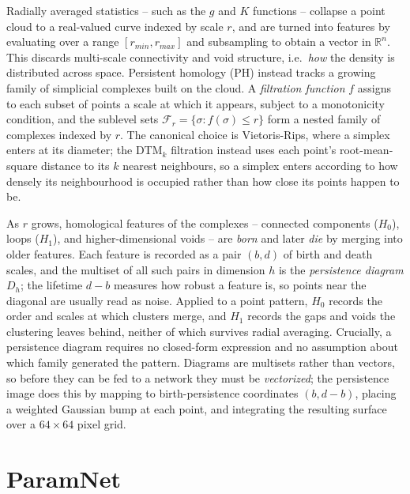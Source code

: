 \documentclass[11pt,a4paper]{article}
\newcommand{\R}{\mathbb{R}}
\newcommand{\filt}{\mathcal{F}}
\begin{document}
Radially averaged statistics -- such as the $g$ and $K$ functions -- collapse a
point cloud to a real-valued curve indexed by scale $r$, and are turned into
features by evaluating over a range $[r_{min}, r_{max}]$ and subsampling to
obtain a vector in $\R^n$. This discards multi-scale connectivity and void
structure, i.e.\ \emph{how} the density is distributed across space. Persistent
homology (PH) instead tracks a growing family of simplicial complexes built on
the cloud. A \emph{filtration function} $f$ assigns to each subset of points a
scale at which it appears, subject to a monotonicity condition, and the
sublevel sets $\filt_r = \{\sigma : f(\sigma)\le r\}$ form a nested family of
complexes indexed by $r$. The canonical choice is Vietoris-Rips, where a
simplex enters at its diameter; the DTM$_k$ filtration \citep{anai2020dtm}
instead uses each point's root-mean-square distance to its $k$ nearest
neighbours, so a simplex enters according to how densely its neighbourhood is
occupied rather than how close its points happen to be.

As $r$ grows, homological features of the complexes -- connected components
($H_0$), loops ($H_1$), and higher-dimensional voids -- are \emph{born} and
later \emph{die} by merging into older features. Each feature is recorded as a
pair $(b,d)$ of birth and death scales, and the multiset of all such pairs in
dimension $h$ is the \emph{persistence diagram} $D_h$; the lifetime $d-b$
measures how robust a feature is, so points near the diagonal are usually read
as noise. Applied to a point pattern, $H_0$ records the order and scales at
which clusters merge, and $H_1$ records the gaps and voids the clustering leaves
behind, neither of which survives radial averaging. Crucially, a persistence
diagram requires no closed-form expression and no assumption about which family
generated the pattern. Diagrams are multisets rather than vectors, so before
they can be fed to a network they must be \emph{vectorized}; the persistence
image \citep{adams2017persistence} does this by mapping to birth-persistence
coordinates $(b, d-b)$, placing a weighted Gaussian bump at each point, and
integrating the resulting surface over a $64\times64$ pixel grid.

\section{ParamNet}
\label{sec:progress}
\end{document}
